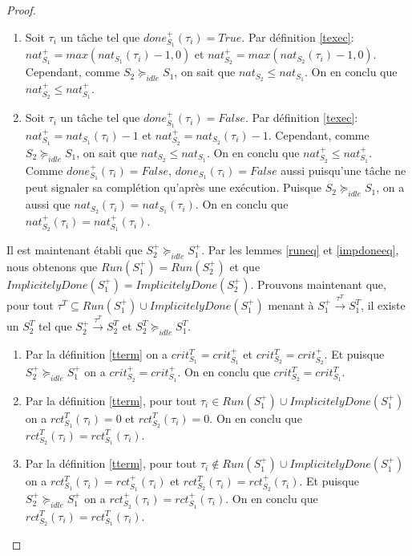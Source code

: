 \documentclass[a4paper]{report}
\theoremstyle{break}
\theoremstyle{breakplain}
\begin{document}
\begin{proof}
\begin{enumerate}
\item Soit $\tau_i$ un tâche tel que $done_{S_1}^+(\tau_i) = True$. Par définition \ref{texec}: $nat_{S_1}^+ = max(nat_{S_1}(\tau_i)-1, 0)$ et $nat_{S_2}^+ = max(nat_{S_2}(\tau_i)-1, 0)$. Cependant, comme $S_2 \succeq_{idle} S_1$, on sait que $nat_{S_2} \leq nat_{S_1}$. On en conclu que $nat_{S_2}^+ \leq nat_{S_1}^+$.
\item Soit $\tau_i$ un tâche tel que $done_{S_1}^+(\tau_i) = False$. Par définition \ref{texec}: $nat_{S_1}^+ = nat_{S_1}(\tau_i)-1$ et $nat_{S_2}^+ = nat_{S_2}(\tau_i)-1$. Cependant, comme $S_2 \succeq_{idle} S_1$, on sait que $nat_{S_2} \leq nat_{S_1}$. On en conclu que $nat_{S_2}^+ \leq nat_{S_1}^+$. Comme $done_{S_1}^+(\tau_i) = False$, $done_{S_1}(\tau_i) = False$ aussi puisqu'une tâche ne peut signaler sa complétion qu'après une exécution. Puisque $S_2 \succeq_{idle} S_1$, on a aussi que $nat_{S_2}(\tau_i) = nat_{S_1}(\tau_i)$. On en conclu que $nat_{S_2}^+(\tau_i) = nat_{S_1}^+(\tau_i)$.
\end{enumerate}

Il est maintenant établi que $S^+_2 \succeq_{idle} S^+_1$. Par les lemmes \ref{runeq} et \ref{impdoneeq}, nous obtenons que $Run(S^+_1) = Run(S^+_2)$ et que $ImplicitelyDone(S^+_1) = ImplicitelyDone(S_2^+)$.
Prouvons maintenant que, pour tout $\tau^T\subseteq Run(S_1^+) \cup ImplicitelyDone(S_1^+)$ menant à $S_1^+ \xrightarrow{\tau^T} S_1^T$, il existe un $S_2^T$ tel que $S_2^+ \xrightarrow{\tau^T} S_2^T$ et $S_2^T \succeq_{idle} S_1^T$.
\begin{enumerate}
\item Par la définition \ref{tterm} on a $crit_{S_1}^T = crit_{S_1}^+$ et $crit_{S_2}^T = crit_{S_2}^+$. Et puisque $S^+_2 \succeq_{idle} S^+_1$ on a $crit_{S_2}^+= crit_{S_1}^+$. On en conclu que $crit_{S_2}^T= crit_{S_1}^T$.
\item Par la définition \ref{tterm}, pour tout $\tau_i \in Run(S_1^+) \cup ImplicitelyDone(S_1^+)$ on a $rct_{S_1}^T(\tau_i) = 0$ et $rct_{S_2}^T(\tau_i) = 0$. On en conclu que $rct_{S_2}^T(\tau_i) = rct_{S_1}^T(\tau_i)$.


\item Par la définition \ref{tterm}, pour tout $\tau_i \notin Run(S_1^+) \cup ImplicitelyDone(S_1^+)$ on a $rct_{S_1}^T(\tau_i) = rct_{S_1}^+(\tau_i)$ et $rct_{S_2}^T(\tau_i) = rct_{S_2}^+(\tau_i)$. Et puisque $S^+_2 \succeq_{idle} S^+_1$ on a $rct_{S_2}^+(\tau_i)= rct_{S_1}^+(\tau_i)$. On en conclu que $rct_{S_2}^T(\tau_i) = rct_{S_1}^T(\tau_i)$.



\end{enumerate}
\end{proof}
\end{document}
